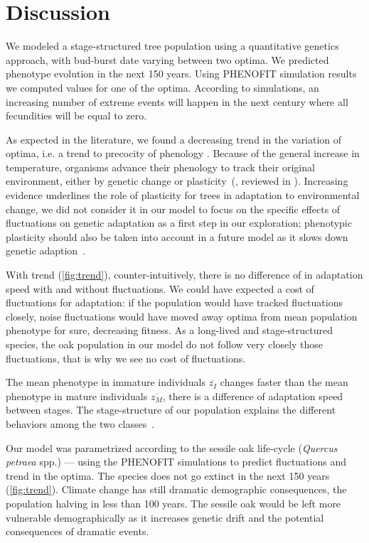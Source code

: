 \label{sec:Disc}
\section*{Discussion}

We modeled a stage-structured tree population using a quantitative genetics approach, with bud-burst date varying between two optima. We predicted phenotype evolution in the next 150 years. Using \textsc{PHENOFIT} simulation results we computed values for one of the optima. According to simulations, an increasing number of extreme events will happen in the next century where all fecundities will be equal to zero.

As expected in the literature, we found a decreasing trend in the variation of optima, i.e. a trend to precocity of phenology \citep{aitken_adaptation_2008, ehrlen_timing_2009}. Because of the general increase in temperature, organisms advance their phenology to track their original environment, either by genetic change or plasticity~(\citealt{savolainen_genetic_2004}, reviewed in \citealt{merila_climate_2014}). Increasing evidence underlines the role of plasticity for trees in adaptation to environmental change, we did not consider it in our model to focus on the specific effects of fluctuations on genetic adaptation as a first step in our exploration; phenotypic plasticity should also be taken into account in a future model as it slows down genetic adaption~\citep{alberto_potential_2013, aitken_adaptation_2008}. 

With trend (\autoref{fig:trend}), counter-intuitively, there is no difference of in adaptation speed with and without fluctuations. We could have expected a cost of fluctuations for adaptation: if the population would have tracked fluctuations closely, noise fluctuations would have moved away optima from mean population phenotype for sure, decreasing fitness. As a long-lived and stage-structured species, the oak population in our model do not follow very closely those fluctuations, that is why we see no cost of fluctuations.

The mean phenotype in immature individuals $\overline{z_I}$ changes faster than the mean phenotype in mature individuals $\overline{z_M}$, there is a difference of adaptation speed between stages. The stage-structure of our population explains the different behaviors among the two classes~\citep{cotto_maladaptation_2014}.

Our model was parametrized according to the sessile oak life-cycle (\textit{Quercus petraea} spp.) — using the \textsc{PHENOFIT} simulations to predict fluctuations and trend in the optima. The species does not go extinct in the next 150 years (\autoref{fig:trend}). Climate change has still dramatic demographic consequences, the population halving in less than 100 years. The sessile oak would be left more vulnerable demographically as it increases genetic drift and the potential consequences of dramatic events.


